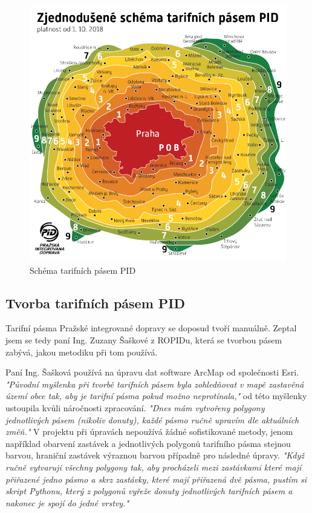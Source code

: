 \begin{figure}[H] \centering
    \includegraphics[width=400pt]{./pictures/pasma-schema.png}
    \caption[Schéma tarifních pásem PID]{Schéma tarifních pásem PID \cite{pid}}
	\label{fig:pasma-schema}                                
\end{figure}

\subsection{Tvorba tarifních pásem PID}

Tarifní pásma Pražské integrované dopravy se doposud tvoří manuálně. Zeptal jsem
se tedy paní Ing. Zuzany Šaškové z ROPIDu, která se tvorbou pásem zabývá, jakou metodiku
při tom používá. 

Paní Ing. Šašková používá na úpravu dat software ArcMap od společnosti Esri.
\textit{"Původní myšlenka při tvorbě tarifních pásem byla zohledňovat v mapě 
zastavěná území obce tak, aby je tarifní pásma pokud možno neprotínala,"} od této
myšlenky ustoupila kvůli náročnosti zpracování. \textit{"Dnes mám vytvořeny polygony 
jednotlivých pásem (nikoliv donuty), každé pásmo ručně upravím dle aktuálních změň."} 
V projektu při úpravách nepoužívá žádné sofistikované metody, jenom například obarvení
zastávek a jednotlivých polygonů tarifního pásma stejnou barvou, hraniční zastávek výraznou barvou 
případně pro následné úpravy. \textit{"Když ručně vytvaruji všechny polygony tak, aby procházeli 
mezi zastávkami které mají přiřazené jedno pásmo a skrz zastávky, které mají přiřazená dvě pásma, 
pustím si skript Pythonu, který z polygonů vyřeže donuty jednotlivých tarifních pásem a nakonec je spojí do jedné vrstvy."}

